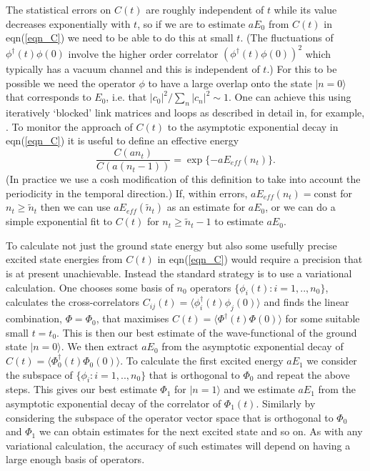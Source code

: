 \documentclass[12pt]{article}
\begin{document}
The statistical errors on $C(t)$ are roughly independent of $t$ while its value decreases
exponentially with $t$, so if we are to estimate $aE_0$ from $C(t)$ in eqn(\ref{eqn_C})
we need to be able to do this at small $t$. (The fluctuations of $\phi^{\dagger}(t)\phi(0)$
involve the higher order correlator $(\phi^{\dagger}(t)\phi(0))^2$ which typically has a vacuum
channel and this is independent of $t$.) For this to be possible we need the operator
$\phi$ to have a large overlap onto the state $|n=0\rangle$ that corresponds to $E_0$,
i.e. that $|c_0|^2/\sum_n |c_n|^2 \sim 1$. One can achieve this using iteratively `blocked'
link matrices and loops
%
\cite{MT-block1,MT-block2}
%
as described in detail in, for example,
%
\cite{BLMTUW_N}.
%
To monitor the approach of  $C(t)$ to the asymptotic exponential decay in eqn(\ref{eqn_C})
it is useful to define an effective energy
%
\begin{equation}
  \frac{C(an_t)}{C(a(n_t-1))} = \exp\{-aE_{eff}(n_t)\}.
\label{eqn_Eeff}
\end{equation}
%
(In practice we use a cosh modification of this definition to take into account the
periodicity in the temporal direction.)
If, within errors,  $aE_{eff}(n_t) = \mathrm{const}$ for $n_t\geq \tilde{n}_t$ then
we can use $aE_{eff}(\tilde{n}_t)$ as an estimate for $aE_0$, or we can do a simple
exponential fit to $C(t)$ for $n_t\geq \tilde{n}_t-1$ to estimate $aE_0$. 


To calculate not just the ground state energy but also some usefully precise excited state
energies from $C(t)$ in eqn(\ref{eqn_C}) would require a precision that is at present
unachievable. Instead the standard strategy is to use a variational calculation. One chooses
some basis of $n_0$ operators $\{\phi_i(t): i=1,..,n_0\}$, calculates the cross-correlators
$C_{ij}(t)= \langle \phi^{\dagger}_i(t)\phi_j(0)\rangle$ and finds the linear combination,
$\Phi = \Phi_0$, that maximises $C(t)= \langle \Phi^{\dagger}(t)\Phi(0)\rangle$
for some suitable small $t=t_0$. This is then our best estimate of the wave-functional
of the ground state $|n=0\rangle$. We then extract $aE_0$ from the asymptotic
exponential decay of $C(t)= \langle \Phi^{\dagger}_0(t)\Phi_0(0)\rangle$. To calculate
the first excited energy $aE_1$ we consider the subspace of $\{\phi_i: i=1,..,n_0\}$
that is orthogonal to $\Phi_0$ and repeat the above steps. This gives our best
estimate $\Phi_1$ for  $|n=1\rangle$ and we estimate $aE_1$ from the asymptotic
exponential decay of the correlator of $\Phi_1(t)$. Similarly by considering
the subspace of the operator vector space that is orthogonal to $\Phi_0$ and $\Phi_1$ 
we can obtain estimates for the next excited state and so on. As with any variational
calculation, the accuracy of such estimates will depend on having a large enough
basis of operators.
\end{document}
